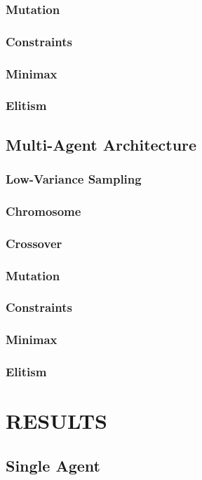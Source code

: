 \documentclass[letterpaper, 10 pt, conference]{ieeeconf}  %
\begin{document}
\subsubsection{Mutation}
\subsubsection{Constraints}
\subsubsection{Minimax}
\subsubsection{Elitism}


\subsection{Multi-Agent Architecture}
\subsubsection{Low-Variance Sampling}
\subsubsection{Chromosome}
\subsubsection{Crossover}
\subsubsection{Mutation}
\subsubsection{Constraints}
\subsubsection{Minimax}
\subsubsection{Elitism}
\section{RESULTS}\label{results}
\subsection{Single Agent}
\end{document}
